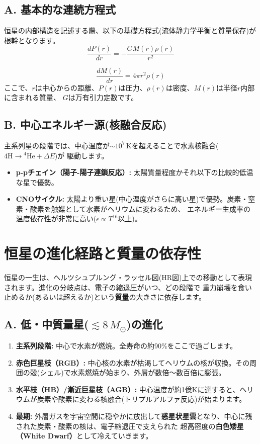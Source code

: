 \documentclass[11pt,a4paper]{article}
\begin{document}
\subsection{A. 基本的な連続方程式}
恒星の内部構造を記述する際、以下の基礎方程式(流体静力学平衡と質量保存)が根幹となります。
\begin{equation}
    \frac{dP(r)}{dr} = -\frac{G M(r) \rho(r)}{r^2}
\end{equation}

\begin{equation}
    \frac{dM(r)}{dr} = 4\pi r^2 \rho(r)
\end{equation}
ここで、$r$は中心からの距離、$P(r)$は圧力、$\rho(r)$は密度、$M(r)$は半径$r$内部に含まれる質量、 $G$は万有引力定数です。

\subsection{B. 中心エネルギー源(核融合反応)}
主系列星の段階では、中心温度が$\sim 10^7 \, \text{K}$を超えることで水素核融合($4\text{H} \rightarrow \text{}^4\text{He} + \Delta E$)が
駆動します。
\begin{itemize}
    \item \textbf{p-pチェイン（陽子-陽子連鎖反応）:} 太陽質量程度かそれ以下の比較的低温な星で優勢。
    \item \textbf{CNOサイクル:} 太陽より重い星(中心温度がさらに高い星)で優勢。炭素・窒素・酸素を触媒として水素がヘリウムに変わるため、
    エネルギー生成率の温度依存性が非常に高い($\epsilon \propto T^{16}$以上)。
\end{itemize}

\section{恒星の進化経路と質量の依存性}
恒星の一生は、ヘルツシュプルング・ラッセル図(HR図)上での移動として表現されます。進化の分岐点は、電子の縮退圧がいつ、どの段階で
重力崩壊を食い止めるか(あるいは超えるか)という\textbf{質量}の大きさに依存します。

\subsection{A. 低・中質量星($\lesssim 8 \, M_\odot$)の進化}
\begin{enumerate}
    \item \textbf{主系列段階:} 中心で水素が燃焼。全寿命の約90\%をここで過ごします。
    \item \textbf{赤色巨星枝（RGB）:} 中心核の水素が枯渇してヘリウムの核が収換。その周囲の殻(シェル)で水素燃焼が始まり、外層が数倍〜数百倍に膨張。
    \item \textbf{水平枝（HB）/漸近巨星枝（AGB）:} 中心温度が約1億Kに達すると、ヘリウムが炭素や酸素に変わる核融合(トリプルアルファ反応)が始まります。
    \item \textbf{最期:} 外層ガスを宇宙空間に穏やかに放出して\textbf{惑星状星雲}となり、中心に残された炭素・酸素の核は、電子縮退圧で支えられた
    超高密度の\textbf{白色矮星（White Dwarf）}として冷えていきます。
\end{enumerate}
\end{document}
